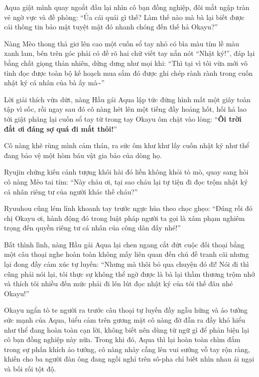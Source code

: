 \documentclass[../main.tex]{subfiles}
\begin{document}

Aqua giật mình quay ngoắt đầu lại nhìn cô bạn đồng nghiệp, đôi mắt ngập tràn vẻ ngờ vực và đề phòng: ``Ủa cái quái gì thế? Làm thế nào mà bà lại biết được cái thông tin bảo mật tuyệt mật đó nhanh chóng đến thế hả Okayu?''

Nàng Mèo thong thả giơ lên cao một cuốn sổ tay nhỏ có bìa màu tím lề màu xanh lam, bên trên góc phải có đề rõ hai chữ viết tay nắn nót ``Nhật ký!'', đáp lại bằng chất giọng thản nhiên, dửng dưng như mọi khi: ``Thì tại vì tôi vừa mới vô tình đọc được toàn bộ kế hoạch mua sắm đó được ghi chép rành rành trong cuốn nhật ký cá nhân của bà ấy mà\~{}''

Lời giải thích vừa dứt, nàng Hầu gái Aqua lập tức đứng hình mất một giây toàn tập vì sốc, rồi ngay sau đó cô nàng hét lên một tiếng đầy hoảng hốt, hối hả lao tới giật phăng lại cuốn sổ tay từ trong tay Okayu ôm chặt vào lòng: ``\textbf{Ôi trời đất ơi đáng sợ quá đi mất thôi!}''

Cô nàng khẽ rùng mình cảm thán, ra sức ôm khư khư lấy cuốn nhật ký như thể đang bảo vệ một hòm báu vật gia bảo của dòng họ.

Ryujin chứng kiến cảnh tượng khôi hài đó liền không khỏi tò mò, quay sang hỏi cô nàng Mèo tai tím: ``Này cháu ơi, tại sao cháu lại tự tiện đi đọc trộm nhật ký cá nhân riêng tư của người khác thế cháu?''

Ryuuhou cũng lém lỉnh khoanh tay trước ngực hùa theo chọc ghẹo: ``Đúng rồi đó chị Okayu ơi, hành động đó trong luật pháp người ta gọi là xâm phạm nghiêm trọng đến quyền riêng tư cá nhân của công dân đấy nhé!''

Bất thình lình, nàng Hầu gái Aqua lại chen ngang cắt đứt cuộc đối thoại bằng một câu thoại nghe hoàn toàn không mấy liên quan đến chủ đề tranh cãi nhưng lại đong đầy cảm xúc tự luyến: ``Nhưng mà thôi bỏ qua chuyện đó đi! Nói đi thì cũng phải nói lại, tôi thực sự không thể ngờ được là bà lại thầm thương trộm nhớ và thích tôi nhiều đến mức phải đi lén lút đọc nhật ký của tôi thế đâu nhé Okayu!''


Okayu ngẩn tò te người ra trước câu thoại tự luyến đầy ngẫu hứng và ảo tưởng sức mạnh của Aqua, biểu cảm trên gương mặt cô nàng đờ đẫn ra đầy khó hiểu như thể đang hoàn toàn cạn lời, không biết nên dùng từ ngữ gì để phản biện lại cô bạn đồng nghiệp này nữa. Trong khi đó, Aqua thì lại hoàn toàn chìm đắm trong sự phấn khích ảo tưởng, cô nàng nhảy cẫng lên vui sướng vỗ tay rộn ràng, khiến cho ba người đàn ông đang ngồi nghỉ trên sô-pha chỉ biết nhìn nhau ái ngại và bối rối tột độ.
\end{document}
